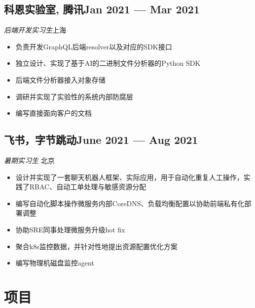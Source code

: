 \documentclass[a4,12pt]{article}
\newcommand{\subtext}[1]{
#1\par\vspace{-0.3cm}}
\newenvironment{zitemize}{
\begin{itemize}\itemsep0pt \parskip0pt \parsep1pt}
{\end{itemize}\vspace{-0.5cm}}
\begin{document}
\subsection*{科恩实验室, 腾讯\hfill Jan 2021 --- Mar 2021} 
\subtext{\textit{后端开发实习生}\hfill 上海} 
    \begin{zitemize}
        \item 负责开发GraphQL后端resolver以及对应的SDK接口
        \item 独立设计、实现了基于AI的二进制文件分析器的Python SDK
        \item 后端文件分析器接入对象存储
        \item 调研并实现了实验性的系统内部防腐层
        \item 编写直接面向客户的文档 
    \end{zitemize}


\subsection*{飞书，字节跳动\hfill June 2021 --- Aug 2021} 
\subtext{\textit{暑期实习生} \hfill 北京} 
    \begin{zitemize}
        \item 设计并实现了一套聊天机器人框架、实际应用，用于自动化重复人工操作，实践了RBAC、自动工单处理与敏感资源分配
        \item 编写自动化脚本操作微服务内部CoreDNS、负载均衡配置以协助前端私有化部署调整
        \item 协助SRE同事处理微服务升级hot fix
        \item 聚合k8s监控数据，并针对性地提出资源配置优化方案
        \item 编写物理机磁盘监控agent
    \end{zitemize}





\section{\textbf{项目}} %
\end{document}
